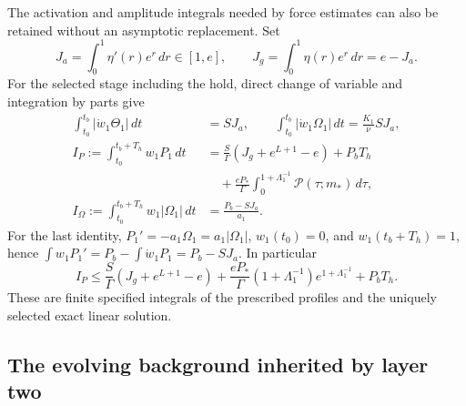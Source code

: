 The activation and amplitude integrals needed by force estimates can
also be retained without an asymptotic replacement. Set
\[
 J_a=\int_0^1\eta'(r)e^r\,dr\in[1,e],\qquad
 J_g=\int_0^1\eta(r)e^r\,dr=e-J_a.
\]
For the selected stage including the hold, direct change of variable
and integration by parts give
\begin{align}
 \int_{t_0}^{t_b}|\dot w_1\Theta_1|\,dt&=S J_a,\qquad
 \int_{t_0}^{t_b}|\dot w_1\Omega_1|\,dt=\frac{K_1}{\nu}S J_a,
 \label{eq:cv-first-activation-cost}\\
 I_P:=\int_{t_0}^{t_b+T_h}w_1P_1\,dt
 &=\frac S\Gamma(J_g+e^{L+1}-e)+P_bT_h\nonumber\\
 &\quad+\frac{eP_*}{\Gamma}\int_0^{1+\Lambda_1^{-1}}
                    \mathcal P(\tau;m_*)\,d\tau,
 \label{eq:cv-first-P-cost}\\
 I_\Omega:=\int_{t_0}^{t_b+T_h}w_1|\Omega_1|\,dt
 &=\frac{P_b-SJ_a}{a_1}.
 \label{eq:cv-first-Omega-cost}
\end{align}
For the last identity, $P_1'=-a_1\Omega_1=a_1|\Omega_1|$,
$w_1(t_0)=0$, and $w_1(t_b+T_h)=1$, hence
$\int w_1P_1'=P_b-\int\dot w_1P_1=P_b-SJ_a$.
In particular
\[
 I_P\leq\frac S\Gamma(J_g+e^{L+1}-e)
 +\frac{eP_*}{\Gamma}(1+\Lambda_1^{-1})e^{1+\Lambda_1^{-1}}
 +P_bT_h.
\]
These are finite specified integrals of the prescribed profiles and
the uniquely selected exact linear solution.

\subsection{The evolving background inherited by layer two}

